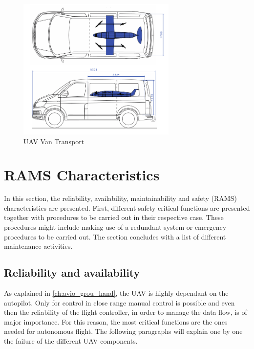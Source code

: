 \begin{figure}[htb]
    \centering
    \includegraphics[width=0.7\textwidth]{OperationsLogistics/Figures/storage.pdf}
    \caption{UAV Van Transport}
    \label{fig:transport}
\end{figure}



\section{RAMS Characteristics} %
\label{sec:rams_char}

In this section, the reliability, availability, maintainability and safety (RAMS) characteristics are presented. First, different safety critical functions are presented together with procedures to be carried out in their respective case. These procedures might include making use of a redundant system or emergency procedures to be carried out. The section concludes with a list of different maintenance activities. 

\subsection{Reliability and availability}

As explained in \autoref{ch:avio_grou_hand}, the UAV is highly dependant on the autopilot. Only for control in close range manual control is possible and even then the reliability of the flight controller, in order to manage the data flow, is of major importance. For this reason, the most critical functions are the ones needed for autonomous flight. The following paragraphs will explain one by one the failure of the different UAV components.

